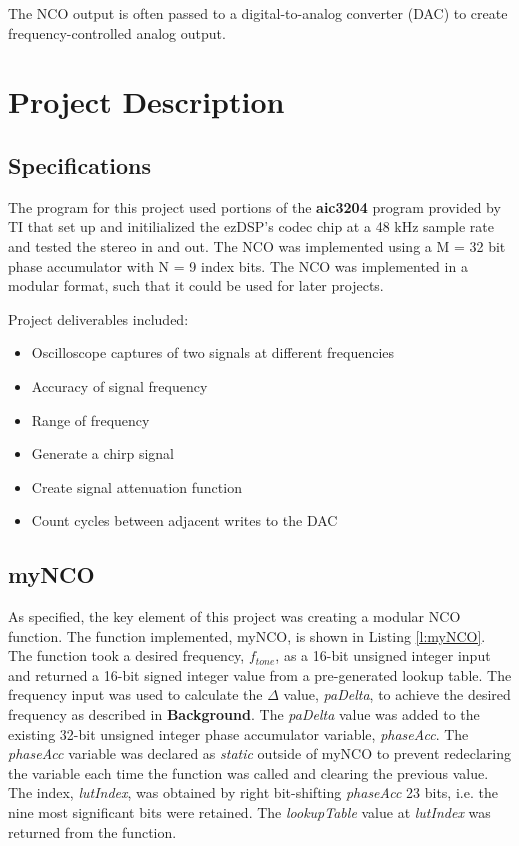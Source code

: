 \documentclass[11pt,pdftex,portrait,letterpaper]{article}
\begin{document}
The NCO output is often passed to a  digital-to-analog converter (DAC) to create frequency-controlled analog output. 

\section{Project Description}

\subsection{Specifications}

The program for this project used portions of the \textbf{aic3204} program provided by TI that set up and initilialized the ezDSP's codec chip at a 48 kHz sample rate and tested the stereo in and out. The NCO was implemented using a M = 32 bit phase accumulator with N = 9 index bits. The NCO was implemented in a modular format, such that it could be used for later projects. 

Project deliverables included:
\begin{itemize}  
\item Oscilloscope captures of two signals at different frequencies
\item Accuracy of signal frequency
\item Range of frequency
\item Generate a chirp signal
\item Create signal attenuation function
\item Count cycles between adjacent writes to the DAC
\end{itemize}

\subsection{myNCO}

As specified, the key element of this project was creating a modular NCO function. The function implemented, myNCO, is shown in Listing \ref{l:myNCO}. The function took a desired frequency,  ${f}_{tone}$,  as a 16-bit unsigned integer input and returned a 16-bit signed integer value from a pre-generated lookup table. The frequency input was used to calculate the $\Delta$ value, \textit{paDelta}, to achieve the desired frequency as described in \textbf{Background}. The \textit{paDelta} value was added to the existing 32-bit unsigned integer phase accumulator variable, \textit{phaseAcc}. The \textit{phaseAcc} variable was declared as \textit{static} outside of myNCO to prevent redeclaring the variable each time the function was called and clearing the previous value. The index, \textit{lutIndex}, was obtained by right bit-shifting \textit{phaseAcc} 23 bits, i.e. the nine most significant bits were retained. The \textit{lookupTable} value at \textit{lutIndex} was returned from the function. 
\end{document}
